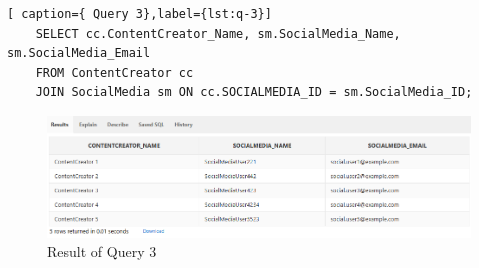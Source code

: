 \begin{lstlisting}[ caption={ Query 3},label={lst:q-3}]
    SELECT cc.ContentCreator_Name, sm.SocialMedia_Name, sm.SocialMedia_Email
    FROM ContentCreator cc
    JOIN SocialMedia sm ON cc.SOCIALMEDIA_ID = sm.SocialMedia_ID;
\end{lstlisting}
\begin{figure}[H]
    \centering
    \includegraphics[width=1\textwidth]{images/dml/Joinq/q3.png}
    \caption{Result of Query 3}
\end{figure}
\clearpage